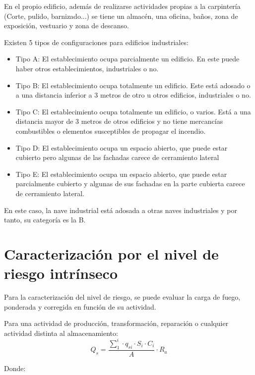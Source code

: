 \documentclass[../main.tex]{subfiles}
\begin{document}
En el propio edificio, además de realizarse actividades propias a la carpintería (Corte, pulido, barnizado...) se tiene un almacén, una oficina, baños, zona de exposición, vestuario y zona de descanso.

Existen 5 tipos de configuraciones para edificios industriales:

\begin{itemize}
    \item Tipo A: El establecimiento ocupa parcialmente un edificio. En este puede haber otros establecimientos, industriales o no.
    \item Tipo B: El establecimiento ocupa totalmente un edificio. Este está adosado o a una distancia inferior a 3 metros de otro u otros edificios, industriales o no.
    \item Tipo C: El establecimiento ocupa totalmente un edificio, o varios. Está a una distancia mayor de 3 metros de otros edificios y no tiene mercancías combustibles o elementos susceptibles de propagar el incendio.
    \item Tipo D: El establecimiento ocupa un espacio abierto, que puede estar cubierto pero algunas de las fachadas carece de cerramiento lateral
    \item Tipo E: El establecimiento ocupa un espacio abierto, que puede estar parcialmente cubierto y algunas de sus fachadas en la parte cubierta carece de cerramiento lateral.
\end{itemize}

En este caso, la nave industrial está adosada a otras naves industriales y por tanto, su categoría es la B. 

\section{Caracterización por el nivel de riesgo intrínseco}

Para la caracterización del nivel de riesgo, se puede evaluar la carga de fuego, ponderada y corregida en función de su actividad.

Para una actividad de producción, transformación, reparación o cualquier actividad distinta al almacenamiento:
\begin{equation}
    Q_s = \frac{\sum_{1}^{i} \cdot q_{si} \cdot S_i \cdot C_i}{A} \cdot R_a
\end{equation}

Donde:
\end{document}
